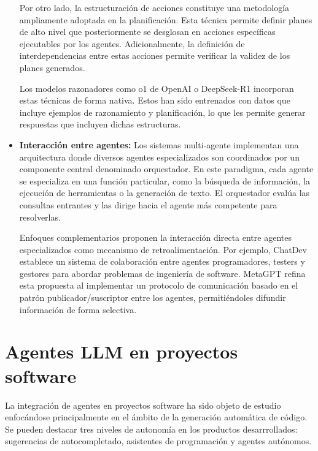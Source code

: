 \begin{itemize}
Por otro lado, la estructuración de acciones constituye una metodología ampliamente adoptada en la planificación\cite{lin_swiftsage_nodate}\cite{huang_language_nodate}\cite{wang_describe_2024}. Esta técnica permite definir planes de alto nivel que posteriormente se desglosan en acciones específicas ejecutables por los agentes\cite{zhu_ghost_2023}\cite{song_llm-planner_2023}\cite{wang_voyager_2023}\cite{liu_odyssey_2024}. Adicionalmente, la definición de interdependencias entre estas acciones permite verificar la validez de los planes generados\cite{raman_planning_nodate}\cite{liu_llmp_2023}\cite{dagan_dynamic_2023}.

Los modelos razonadores como o1 de OpenAI o DeepSeek-R1 incorporan estas técnicas de forma nativa\cite{noauthor_deepseek-r1deepseek_r1pdf_nodate}. Estos han sido entrenados con datos que incluye ejemplos de razonamiento y planificación, lo que les permite generar respuestas que incluyen dichas estructuras.


\item{\textbf{Interacción entre agentes: }}Los sistemas multi-agente implementan una arquitectura donde diversos agentes especializados son coordinados por un componente central denominado orquestador\cite{karpas_mrkl_2022}\cite{ge_openagi_nodate}. En este paradigma, cada agente se especializa en una función particular, como la búsqueda de información, la ejecución de herramientas o la generación de texto. El orquestador evalúa las consultas entrantes y las dirige hacia el agente más competente para resolverlas.

Enfoques complementarios proponen la interacción directa entre agentes especializados como mecanismo de retroalimentación\cite{zhuge_mindstorms_2023}\cite{du_improving_nodate}. Por ejemplo, ChatDev\cite{qian_chatdev_2024} establece un sistema de colaboración entre agentes programadores, testers y gestores para abordar problemas de ingeniería de software. MetaGPT\cite{hong_metagpt_2024} refina esta propuesta al implementar un protocolo de comunicación basado en el patrón publicador/suscriptor entre los agentes, permitiéndoles difundir información de forma selectiva. 
\end{itemize}


\section{Agentes LLM en proyectos software}

La integración de agentes en proyectos software ha sido objeto de estudio enfocándose principalmente en el ámbito de la generación automática de código. Se pueden destacar tres niveles de autonomía en los productos desarrrollados: sugerencias de autocompletado, asistentes de programación y agentes autónomos. 

